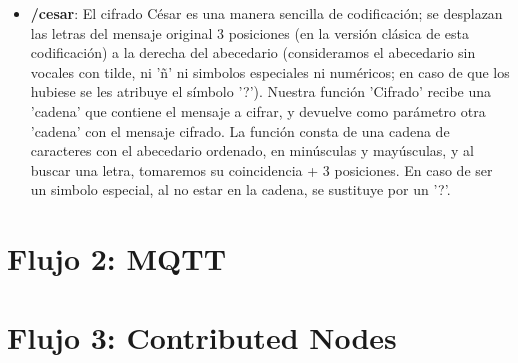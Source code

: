 \documentclass{article}
\begin{document}
\begin{itemize}
\item \textbf{/cesar}: El cifrado César es una manera sencilla de codificación; se desplazan las letras del mensaje original 3 posiciones (en la versión clásica de esta codificación) a la derecha del abecedario (consideramos el abecedario sin vocales con tilde, ni 'ñ' ni simbolos especiales ni numéricos; en caso de que los hubiese se les atribuye el símbolo '?'). Nuestra función 'Cifrado' recibe una 'cadena' que contiene el mensaje a cifrar, y devuelve como parámetro otra 'cadena' con el mensaje cifrado. La función consta de una cadena de caracteres con el abecedario ordenado, en minúsculas y mayúsculas, y al buscar una letra, tomaremos su coincidencia + 3 posiciones. En caso de ser un simbolo especial, al no estar en la cadena, se sustituye por un '?'. 
\end{itemize}

%
%
%
%
%



\newpage
\section{Flujo 2: MQTT}



\newpage
\section{Flujo 3: Contributed Nodes}
\end{document}
